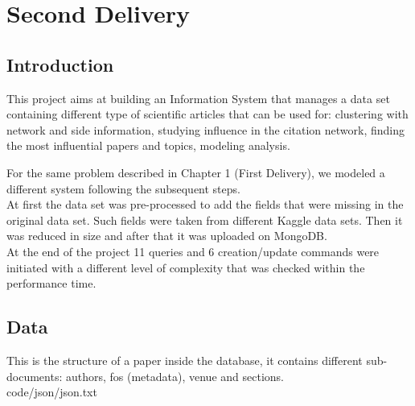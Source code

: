 \documentclass{Configuration_Files/PoliMi3i_thesis}
\begin{document}
\chapter{Second Delivery}

\section{Introduction}
\label{se:probdes1}
This project aims at building an Information System that manages a data set containing different type of scientific articles that can be used for: clustering with network and side information, studying influence in the citation network, finding the most influential papers and topics, modeling analysis.

For the same problem described in Chapter 1 (First Delivery), we modeled a different system following the subsequent steps.\\
At first the data set was pre-processed to add the fields that were missing in the original data set. Such fields were taken from different Kaggle data sets. 
Then it was reduced in size and after that it was uploaded on MongoDB.\\
At the end of the project 11 queries and 6 creation/update commands were initiated with a different level of complexity that was checked within the performance time.\\

\section{Data}
This is the structure of a paper inside the database, it contains different sub-documents: authors, fos (metadata), venue and sections.\\


{code/json/json.txt}
\label{json}
\end{document}

